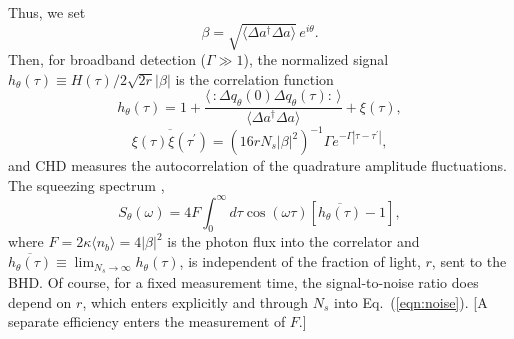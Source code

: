 \documentclass[twocolumn,aps,eqsecnum,showkeys,amsmath]{revtex4}
\begin{document}
Thus, we set
%
\begin{equation}
\beta=\sqrt{\langle\Delta a^\dagger\Delta a\rangle}\,e^{i\theta}.
\end{equation}
Then, for broadband detection ($\Gamma\gg1$), the normalized signal
$h_\theta(\tau)\equiv H(\tau)/2\sqrt{2r}|\beta|$ is the correlation 
function
%
\begin{equation} 	\label{eqn:smallcor}
h_\theta(\tau) = 1+\frac{\langle\,:\Delta q_\theta(0)\Delta
	q_\theta(\tau)\!:\,\rangle}{\langle\Delta a^\dagger\Delta a\rangle}
	+\xi(\tau),
\end{equation}
%
\begin{equation} 	\label{eqn:noise}
\overline{\xi(\tau)\xi(\tau^\prime)} = (16rN_s|\beta|^2)^{-1}
	\Gamma e^{-\Gamma|\tau-\tau^\prime|},
\end{equation}
and CHD measures the autocorrelation of the quadrature amplitude
fluctuations. The squeezing spectrum \cite{CCFO00,FOCC00},
%
\begin{equation}
S_\theta(\omega)=4F\!\int_0^\infty\! 
	d\tau\cos(\omega\tau)[\overline{h_\theta (\tau)}-1],
\end{equation}
where $F=2\kappa \langle n_b\rangle=4|\beta|^2$ is the photon flux into
the correlator and $\overline{h_\theta(\tau)}\equiv\lim_{N_s\to\infty}
h_\theta(\tau)$, is independent of the fraction of light,
$r$, sent to the BHD. Of course, for a fixed measurement time, the
signal-to-noise ratio does depend on $r$, which enters explicitly and
through $N_s$ into Eq.\ (\ref{eqn:noise}). [A separate efficiency 
enters the measurement of $F$.]
\end{document}

